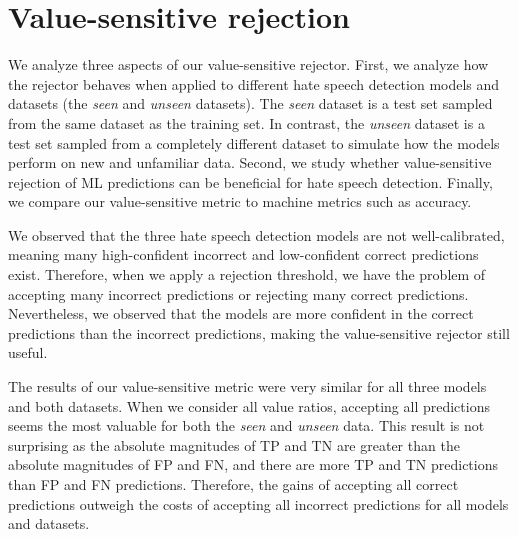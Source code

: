 \section{Value-sensitive rejection}
\label{sec:discussion-rejection}
We analyze three aspects of our value-sensitive rejector.
%
First, we analyze how the rejector behaves when applied to different hate speech detection models and datasets (the \emph{seen} and \emph{unseen} datasets).
%
The \emph{seen} dataset is a test set sampled from the same dataset as the training set.
%
In contrast, the \emph{unseen} dataset is a test set sampled from a completely different dataset to simulate how the models perform on new and unfamiliar data.
%
Second, we study whether value-sensitive rejection of ML predictions can be beneficial for hate speech detection.
%
Finally, we compare our value-sensitive metric to machine metrics such as accuracy.
%

%
We observed that the three hate speech detection models are not well-calibrated, meaning many high-confident incorrect and low-confident correct predictions exist.
%
Therefore, when we apply a rejection threshold, we have the problem of accepting many incorrect predictions or rejecting many correct predictions.
%
Nevertheless, we observed that the models are more confident in the correct predictions than the incorrect predictions, making the value-sensitive rejector still useful.
%

%
The results of our value-sensitive metric were very similar for all three models and both datasets.
%
When we consider all value ratios, accepting all predictions seems the most valuable for both the \emph{seen} and \emph{unseen} data.
%
This result is not surprising as the absolute magnitudes of TP and TN are greater than the absolute magnitudes of FP and FN, and there are more TP and TN predictions than FP and FN predictions.
%
Therefore, the gains of accepting all correct predictions outweigh the costs of accepting all incorrect predictions for all models and datasets.
%

